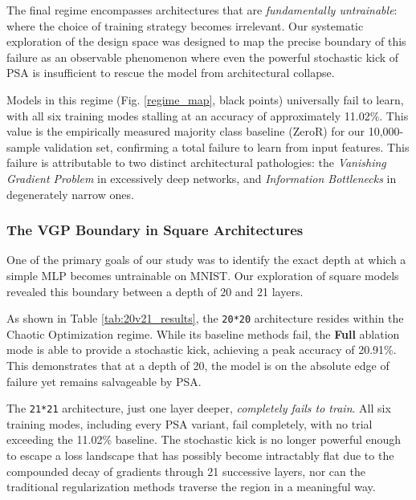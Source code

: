 \documentclass[conference]{IEEEtran}
\begin{document}
The final regime encompasses architectures that are \textit{fundamentally untrainable}: where the choice of training strategy becomes irrelevant. Our systematic exploration of the design space was designed to map the precise boundary of this failure as an observable phenomenon where even the powerful stochastic kick of PSA is insufficient to rescue the model from architectural collapse.

Models in this regime (Fig. \ref{regime_map}, black points) universally fail to learn, with all six training modes stalling at an accuracy of approximately 11.02\%. This value is the empirically measured majority class baseline (ZeroR) for our 10,000-sample validation set, confirming a total failure to learn from input features. This failure is attributable to two distinct architectural pathologies: the \textit{Vanishing Gradient Problem} in excessively deep networks, and \textit{Information Bottlenecks} in degenerately narrow ones.

\subsubsection{The VGP Boundary in Square Architectures}

One of the primary goals of our study was to identify the exact depth at which a simple MLP becomes untrainable on MNIST. Our exploration of square models revealed this boundary between a depth of 20 and 21 layers.

As shown in Table \ref{tab:20v21_results}, the \texttt{20*20} architecture resides within the Chaotic Optimization regime. While its baseline methods fail, the \textbf{Full} ablation mode is able to provide a stochastic kick, achieving a peak accuracy of 20.91\%. This demonstrates that at a depth of 20, the model is on the absolute edge of failure yet remains salvageable by PSA.

The \texttt{21*21} architecture, just one layer deeper, \textit{completely fails to train}. All six training modes, including every PSA variant, fail completely, with no trial exceeding the 11.02\% baseline. The stochastic kick is no longer powerful enough to escape a loss landscape that has possibly become intractably flat due to the compounded decay of gradients through 21 successive layers, nor can the traditional regularization methods traverse the region in a meaningful way.
\end{document}
